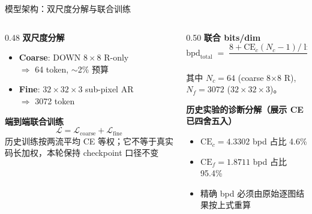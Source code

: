\documentclass[10pt,aspectratio=169]{beamer}
\begin{document}
\begin{frame}{模型架构：双尺度分解与联合训练}
\begin{columns}[T]
\begin{column}{0.48\textwidth}
\textbf{双尺度分解}
\begin{itemize}
  \item \textbf{Coarse}: DOWN $8{\times}8$ R-only \\
        $\Rightarrow$ 64 token, $\sim$2\% 预算
  \item \textbf{Fine}: $32{\times}32{\times}3$ sub-pixel AR \\
        $\Rightarrow$ 3072 token
\end{itemize}

\bigskip
\textbf{端到端联合训练}
\[
\mathcal{L} = \mathcal{L}_{\text{coarse}} + \mathcal{L}_{\text{fine}}
\]
历史训练按两流平均 CE 等权；它不等于真实码长加权，本轮保持 checkpoint 口径不变
\end{column}
\begin{column}{0.50\textwidth}
\textbf{联合 bits/dim}
\[
\mathrm{bpd}_{\text{total}} \;=\; \frac{8+\mathrm{CE}_c(N_c-1)/\ln2+8+\mathrm{CE}_f(N_f-1)/\ln2}{N_f}
\]

\medskip
其中 $N_c = 64$ (coarse 8$\times$8 R), $N_f = 3072$ ($32{\times}32{\times}3$)。

\medskip
\textbf{历史实验的诊断分解（展示 CE 已四舍五入）}
\begin{itemize}
  \item $\mathrm{CE}_c = 4.3302$ \quad bpd 占比 \alert{4.6\%}
  \item $\mathrm{CE}_f = 1.8711$ \quad bpd 占比 \alert{95.4\%}
  \item 精确 bpd 必须由原始逐图结果按上式重算
\end{itemize}
\end{column}
\end{columns}
\end{frame}
\end{document}

